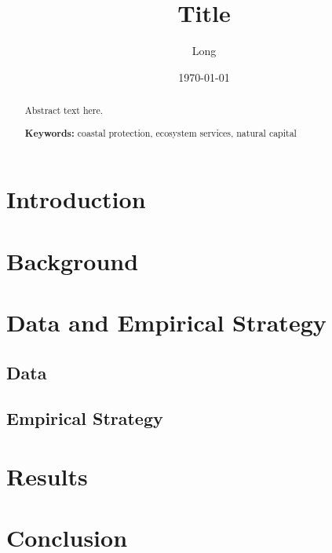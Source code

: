 \documentclass[12pt]{article}
\title{Title}
\author{Long}
\date{\today}
\begin{document}
\maketitle

\begin{abstract}
\noindent
Abstract text here.

\medskip
\noindent \textbf{Keywords:} coastal protection, ecosystem services, natural capital
\end{abstract}

\newpage

\section{Introduction}
\label{sec:intro}



\section{Background}
\label{sec:background}



\section{Data and Empirical Strategy}
\label{sec:data}

\subsection{Data}

\subsection{Empirical Strategy}



\section{Results}
\label{sec:results}



\section{Conclusion}
\label{sec:conclusion}





\end{document}

